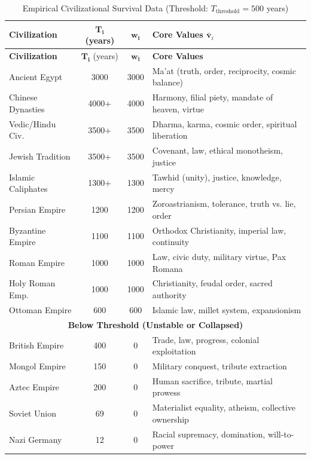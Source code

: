 \documentclass[11pt,a4paper]{article}
\theoremstyle{definition}
\theoremstyle{remark}
\begin{document}
\begin{longtable}{|l|c|c|p{5cm}|}
\caption{Empirical Civilizational Survival Data (Threshold: \(T_{\text{threshold}} = 500\) years)} \label{tab:survival_data} \\
\hline
\textbf{Civilization} & \(\mathbf{T_i}\) (years) & \(\mathbf{w_i}\) & \textbf{Core Values \(\bar{\mathbf{v}}_i\)} \\
\hline
\endfirsthead
\hline
\textbf{Civilization} & \(\mathbf{T_i}\) (years) & \(\mathbf{w_i}\) & \textbf{Core Values} \\
\hline
\endhead
\hline
\endfoot

Ancient Egypt & 3000 & 3000 & Ma'at (truth, order, reciprocity, cosmic balance) \\
\hline
Chinese Dynasties & 4000+ & 4000 & Harmony, filial piety, mandate of heaven, virtue \\
\hline
Vedic/Hindu Civ. & 3500+ & 3500 & Dharma, karma, cosmic order, spiritual liberation \\
\hline
Jewish Tradition & 3500+ & 3500 & Covenant, law, ethical monotheism, justice \\
\hline
Islamic Caliphates & 1300+ & 1300 & Tawhid (unity), justice, knowledge, mercy \\
\hline
Persian Empire & 1200 & 1200 & Zoroastrianism, tolerance, truth vs. lie, order \\
\hline
Byzantine Empire & 1100 & 1100 & Orthodox Christianity, imperial law, continuity \\
\hline
Roman Empire & 1000 & 1000 & Law, civic duty, military virtue, Pax Romana \\
\hline
Holy Roman Emp. & 1000 & 1000 & Christianity, feudal order, sacred authority \\
\hline
Ottoman Empire & 600 & 600 & Islamic law, millet system, expansionism \\
\hline
\multicolumn{4}{|c|}{\textbf{Below Threshold (Unstable or Collapsed)}} \\
\hline
British Empire & 400 & 0 & Trade, law, progress, colonial exploitation \\
\hline
Mongol Empire & 150 & 0 & Military conquest, tribute extraction \\
\hline
Aztec Empire & 200 & 0 & Human sacrifice, tribute, martial prowess \\
\hline
Soviet Union & 69 & 0 & Materialist equality, atheism, collective ownership \\
\hline
Nazi Germany & 12 & 0 & Racial supremacy, domination, will-to-power \\
\hline
\end{longtable}
\end{document}
